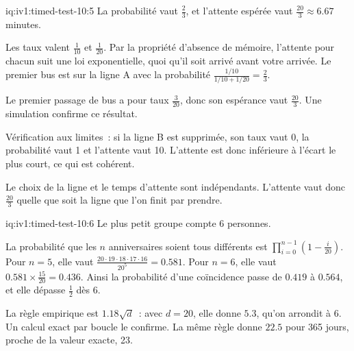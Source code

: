 \begin{solution}{iq:iv1:timed-test-10:5}
La probabilité vaut $\frac23$, et l'attente espérée vaut $\frac{20}{3} \approx 6.67$ minutes.

Les taux valent $\frac{1}{10}$ et $\frac{1}{20}$. Par la propriété d'absence de mémoire, l'attente pour chacun suit une loi exponentielle, quoi qu'il soit arrivé avant votre arrivée. Le premier bus est sur la ligne A avec la probabilité $\frac{1/10}{1/10 + 1/20} = \frac23$.

Le premier passage de bus a pour taux $\frac{3}{20}$, donc son espérance vaut $\frac{20}{3}$. Une simulation confirme ce résultat.

Vérification aux limites~: si la ligne B est supprimée, son taux vaut 0, la probabilité vaut 1 et l'attente vaut 10. L'attente est donc inférieure à l'écart le plus court, ce qui est cohérent.

Le choix de la ligne et le temps d'attente sont indépendants. L'attente vaut donc $\frac{20}{3}$ quelle que soit la ligne que l'on finit par prendre.

\end{solution}

\begin{solution}{iq:iv1:timed-test-10:6}
Le plus petit groupe compte 6 personnes.

La probabilité que les $n$ anniversaires soient tous différents est $\prod_{i = 0}^{n - 1}(1 - \frac{i}{20})$. Pour $n = 5$, elle vaut $\frac{20 \cdot 19 \cdot 18 \cdot 17 \cdot 16}{20^5} = 0.581$. Pour $n = 6$, elle vaut $0.581 \times \frac{15}{20} = 0.436$. Ainsi la probabilité d'une coïncidence passe de $0.419$ à $0.564$, et elle dépasse $\frac12$ dès 6.

La règle empirique est $1.18\sqrt{d}$~: avec $d = 20$, elle donne $5.3$, qu'on arrondit à 6. Un calcul exact par boucle le confirme. La même règle donne $22.5$ pour 365 jours, proche de la valeur exacte, 23.

\end{solution}

